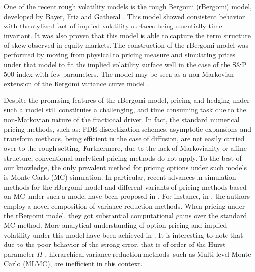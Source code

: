 One of the recent rough volatility models is the rough Bergomi (rBergomi) model, developed by Bayer, Friz and Gatheral \cite{bayer2016pricing}. This model showed   consistent behavior with the stylized fact of implied volatility surfaces being essentially time-invariant. It was also proven that this model 
 is able to capture the term structure of skew observed in equity markets. The construction of the rBergomi model was performed by  moving from  physical to pricing measure and simulating prices under that model to fit  the implied volatility surface well in the case of the S\&P $500$ index with few parameters. The model may be seen as a non-Markovian extension of the Bergomi variance curve model \cite{bergomi2005smile}.
 
Despite the promising features of the rBergomi model, pricing  and hedging under such a model still constitutes a challenging, and time consuming task due  to the non-Markovian nature of the fractional driver.  In fact, the standard numerical pricing methods, such as: PDE discretization schemes, asymptotic expansions and transform
methods, being efficient in the case of diffusion, are not easily  carried over to the rough setting. Furthermore,  due to the lack of Markovianity or affine structure, conventional analytical pricing methods  do not apply. To the best of our knowledge, the only prevalent method for pricing  options under such models is Monte Carlo (MC) simulation. In particular,  recent advances in simulation methods for the rBergomi model and different variants of pricing methods based on  MC under such a model   have been proposed in \cite{bayer2016pricing,bayer2017regularity,mccrickerd2017turbocharging,bennedsen2017hybrid,jacquier2018vix}.  For instance, in \cite{mccrickerd2017turbocharging}, the authors employ a novel composition of variance reduction methods. When pricing under the rBergomi model, they got  substantial computational gains  over the standard MC method.  More   analytical understanding of option pricing and implied volatility under this model have been achieved  in \cite{jacquier2017pathwise,bayer2017short,forde2017asymptotics}.  It is interesting to note that due to the poor behavior of the strong error, that is of order of the Hurst parameter  $H$ \cite{neuenkirch2016order}, hierarchical variance reduction methods, such as Multi-level Monte Carlo (MLMC), are inefficient in this context.

